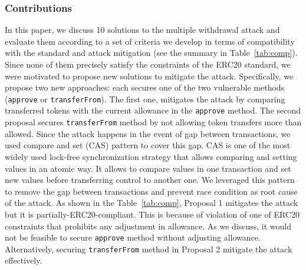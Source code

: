 \subsubsection*{Contributions} In this paper, we discuss 10 solutions to the multiple withdrawal attack and evaluate them according to a set of criteria we develop in terms of compatibility with the standard and attack mitigation (see the summary in Table~\ref{tab:comp}). Since none of them precisely satisfy the constraints of the ERC20 standard, we were motivated to propose new solutions to mitigate the attack. Specifically, we propose  two new approaches: each secures one of the two vulnerable methods (\ie \texttt{approve} or \texttt{transferFrom}). The first one, mitigates the attack by comparing transferred tokens with the current allowance in the \texttt{approve} method. The second proposal secures \texttt{transferFrom} method by not allowing token transfers more than allowed. Since the attack happens in the event of gap between transactions, we used compare and set (CAS) pattern\cite{Ref06} to cover this gap. CAS is one of the most widely used lock-free synchronization strategy that allows comparing and setting values in an atomic way. It allows to compare values in one transaction and set new values before transferring control to another one. We leveraged this pattern to remove the gap between transactions and prevent race condition as root cause of the attack. As shown in the Table~\ref{tab:comp}, Proposal 1 mitigates the attack but it is partially-ERC20-compliant. This is because of violation of one of ERC20 constraints that prohibits any adjustment in allowance. As we discuss, it would not be feasible to secure \texttt{approve} method without adjusting allowance. Alternatively, securing \texttt{transferFrom} method in Proposal 2 mitigate the attack effectively.

